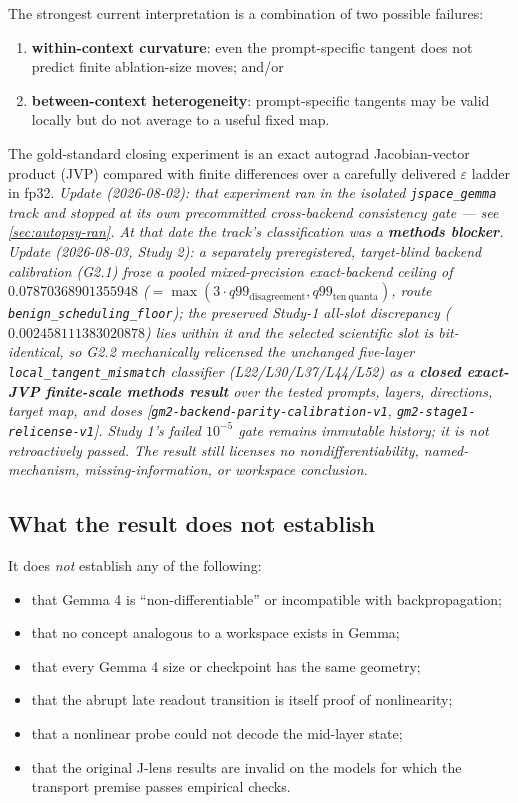 \documentclass[11pt]{article}
\newcommand{\eps}{\varepsilon}
\theoremstyle{definition}
\theoremstyle{remark}
\begin{document}
\begin{statusbox}
The strongest current interpretation is a combination of two possible failures:
\begin{enumerate}
  \item \textbf{within-context curvature}: even the prompt-specific tangent does not predict finite ablation-size moves; and/or
  \item \textbf{between-context heterogeneity}: prompt-specific tangents may be valid locally but do not average to a useful fixed map.
\end{enumerate}
The gold-standard closing experiment is an exact autograd Jacobian-vector product (JVP) compared with finite differences over a carefully delivered $\eps$ ladder in fp32.
\emph{Update (2026-08-02): that experiment ran in the isolated
\texttt{jspace\_gemma} track and stopped at its own precommitted
cross-backend consistency gate --- see \cref{sec:autopsy-ran}. At that
date the track's classification was a \textbf{methods blocker}.}
\emph{Update (2026-08-03, Study 2): a separately preregistered,
target-blind backend calibration (G2.1) froze a pooled mixed-precision
exact-backend ceiling of $0.07870368901355948$
($=\max(3\cdot q99_{\mathrm{disagreement}}, q99_{\mathrm{ten\ quanta}})$,
route \texttt{benign\_scheduling\_floor}); the preserved Study-1
all-slot discrepancy ($0.002458111383020878$) lies within it and the
selected scientific slot is bit-identical, so G2.2 mechanically
relicensed the unchanged five-layer \texttt{local\_tangent\_mismatch}
classifier (L22/L30/L37/L44/L52) as a \textbf{closed exact-JVP
finite-scale methods result} over the tested prompts, layers,
directions, target map, and doses
[\texttt{gm2-backend-parity-calibration-v1},
\texttt{gm2-stage1-relicense-v1}]. Study 1's failed $10^{-5}$ gate
remains immutable history; it is not retroactively passed. The result
still licenses no nondifferentiability, named-mechanism,
missing-information, or workspace conclusion.}
\end{statusbox}

\subsection{What the result does not establish}
It does \emph{not} establish any of the following:
\begin{itemize}
  \item that Gemma 4 is ``non-differentiable'' or incompatible with backpropagation;
  \item that no concept analogous to a workspace exists in Gemma;
  \item that every Gemma 4 size or checkpoint has the same geometry;
  \item that the abrupt late readout transition is itself proof of nonlinearity;
  \item that a nonlinear probe could not decode the mid-layer state;
  \item that the original J-lens results are invalid on the models for which the transport premise passes empirical checks.
\end{itemize}
\end{document}
